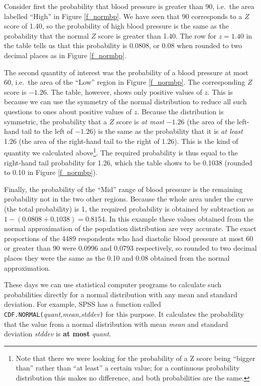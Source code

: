 Consider first the probability that blood pressure is greater than 90,
i.e.\ the area labelled ``High'' in Figure \ref{f_normbp}. We have seen
that 90 corresponds to a $Z$ score of 1.40, so the probability of
high blood pressure is the same as the probability that the normal $Z$
score is greater than 1.40. The row for $z=1.40$ in the table tells us
that this probability is 0.0808, or 0.08 when rounded to two decimal
places as in Figure \ref{f_normbp}.

The second quantity of interest was the probability of a blood pressure
at most 60, i.e.\ the area of the ``Low'' region in Figure
\ref{f_normbp}. The corresponding $Z$ score is $-1.26$. The table,
however, shows only positive values of $z$. This is because we
can use the symmetry of the normal distribution to reduce all such
questions to ones about positive values of $z$. Because the
distribution is symmetric, the probability that a $Z$ score is \emph{at
most} $-1.26$ (the area of the left-hand tail to the left of $-1.26$)
is the same as the probability that it is \emph{at least} 1.26 (the area
of the right-hand tail to the right of 1.26).
This is the kind of quantity we calculated above\footnote{Note that there we were looking for the
probability of a Z score being ``bigger than'' rather than ``at least''
a certain value; for a continuous probability distribution this makes no
difference, and both probabilities are the same.}. The required
probability is thus equal to the right-hand tail probability for 1.26, which
the table shows to be 0.1038
(rounded to 0.10 in Figure
\ref{f_normbp}).

Finally, the probability of the ``Mid'' range of blood pressure is the
remaining probability not in the two other regions. Because the whole
area under the curve (the total probability) is 1, the required
probability is obtained by subtraction as $1-(0.0808+0.1038)=0.8154$. In this example these values
obtained from the normal approximation of the population distribution
are very accurate. The exact proportions of the 4489 respondents who had
diastolic blood pressure at most 60 or greater than 90 were 0.0996 and
0.0793 respectively, so rounded to two decimal places they were the same
as the 0.10 and 0.08 obtained from the normal approximation.

\label{p_cdfnorm}
These days we can use statistical computer programs
to calculate such
probabilities directly for a normal distribution with any mean and
standard deviation. For example, SPSS has a function called
\texttt{CDF.NORMAL(}\emph{quant,mean,stddev}\texttt{)} for this purpose.
It calculates the probability that the value from a normal distribution
with mean \emph{mean} and standard deviation \emph{stddev} is \textbf{at most}
\emph{quant}.

